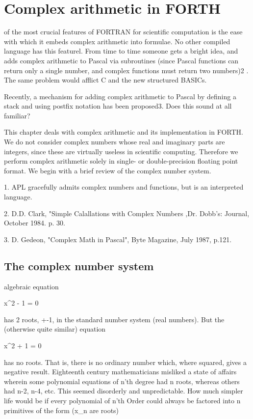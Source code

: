 \chapter{Complex arithmetic in FORTH}
\startcontents[chapters]

 of the most crucial features of FORTRAN for scientific computation is the ease with which it embeds complex arithmetic into formulae. No other compiled language has this featurel. From time to time someone gets a bright idea, and adds complex arithmetic to Pascal via subroutines (since Pascal functions can return only a single number, and complex functions must return two numbers)2 . The same problem would afflict C and the new structured BASICs.

Recently, a mechanism for adding complex arithmetic to Pascal by defining a stack and using postfix notation has been proposed3. Does this sound at all familiar?

This chapter deals with complex arithmetic and its implementation in FORTH. We do not consider complex numbers whose real and imaginary parts are integers, since these are virtually useless in scientific computing. Therefore we perform complex arithmetic solely in single- or double-precision floating point format. We begin with a brief review of the complex number system.

 

1. APL gracefully admits complex numbers and functions, but is an interpreted language.

2. D.D. Clark, "Simple Calallations with Complex Numbers ,Dr. Dobb's: Journal, October 1984. p. 30.

3. D. Gedeon, "Complex Math in Pascal", Byte Magazine, July 1987, p.121.

\section{The complex number system}
 algebraic equation

x^2 - 1 = 0

has 2 roots, +-1, in the standard number system (real numbers). But the (otherwise quite similar) equation

x^2 + 1 = 0

has no roots. That is, there is no ordinary number which, where squared, gives a negative result. Eighteenth century mathematicians misliked a state of affairs wherein some polynomial equations of n’th degree had n roots, whereas others had n-2, n-4, etc. This seemed disorderly and unpredictable. How much simpler life would be if every polynomial of n’th Order could always be factored into n primitives of the form (x_n are roots)

